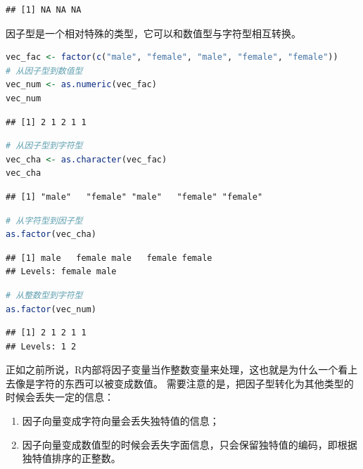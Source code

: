 \documentclass[]{ctexbook}
\providecommand{\tightlist}{%
  \setlength{\itemsep}{0pt}\setlength{\parskip}{0pt}}
\begin{document}
\begin{lstlisting}
## [1] NA NA NA
\end{lstlisting}

因子型是一个相对特殊的类型，它可以和数值型与字符型相互转换。

\begin{lstlisting}[language=R]
vec_fac <- factor(c("male", "female", "male", "female", "female"))
# 从因子型到数值型
vec_num <- as.numeric(vec_fac)
vec_num
\end{lstlisting}

\begin{lstlisting}
## [1] 2 1 2 1 1
\end{lstlisting}

\begin{lstlisting}[language=R]
# 从因子型到字符型
vec_cha <- as.character(vec_fac)
vec_cha
\end{lstlisting}

\begin{lstlisting}
## [1] "male"   "female" "male"   "female" "female"
\end{lstlisting}

\begin{lstlisting}[language=R]
# 从字符型到因子型
as.factor(vec_cha)
\end{lstlisting}

\begin{lstlisting}
## [1] male   female male   female female
## Levels: female male
\end{lstlisting}

\begin{lstlisting}[language=R]
# 从整数型到字符型
as.factor(vec_num)
\end{lstlisting}

\begin{lstlisting}
## [1] 2 1 2 1 1
## Levels: 1 2
\end{lstlisting}

正如之前所说，R内部将因子变量当作整数变量来处理，这也就是为什么一个看上去像是字符的东西可以被变成数值。
需要注意的是，把因子型转化为其他类型的时候会丢失一定的信息：

\begin{enumerate}
\def\labelenumi{\arabic{enumi}.}
\tightlist
\item
  因子向量变成字符向量会丢失独特值的信息；
\item
  因子向量变成数值型的时候会丢失字面信息，只会保留独特值的编码，即根据独特值排序的正整数。
\end{enumerate}
\end{document}
